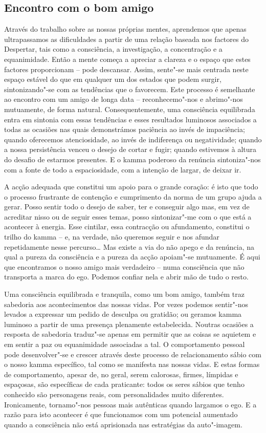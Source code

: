 \subsection{Encontro com o bom amigo}

Através do trabalho sobre as nossas próprias mentes, aprendemos que apenas
ultrapassamos as dificuldades a partir de uma relação baseada nos factores do
Despertar, tais como a consciência, a investigação, a concentração e a
equanimidade. Então a mente começa a apreciar a clareza e o espaço que estes
factores proporcionam -- pode descansar. Assim, sente"-se mais centrada neste
espaço estável do que em qualquer um dos estados que podem surgir,
sintonizando"-se com as tendências que o favorecem. Este processo é semelhante
ao encontro com um amigo de longa data -- reconhecemo"-nos e abrimo"-nos
mutuamente, de forma natural. Consequentemente, uma consciência equilibrada
entra em sintonia com essas tendências e esses resultados luminosos associados a
todas as ocasiões nas quais demonstrámos paciência ao invés de impaciência;
quando oferecemos atenciosidade, ao invés de indiferença ou negatividade; quando
a nossa persistência venceu o desejo de cortar e fugir; quando estivemos à
altura do desafio de estarmos presentes. E o kamma poderoso da renúncia
sintoniza"-nos com a fonte de todo a espaciosidade, com a intenção de largar, de
deixar ir.

A acção adequada que constitui um apoio para o grande coração: é isto que todo o
processo frustrante de contenção e cumprimento da norma de um grupo ajuda a
gerar. Posso sentir todo o desejo de saber, ter e conseguir algo mas, em vez de
acreditar nisso ou de seguir esses temas, posso sintonizar"-me com o que está a
acontecer à energia. Esse cintilar, essa contracção ou afundamento, constitui o
trilho do kamma -- e, na verdade, não queremos seguir e nos afundar
repetidamente nesse percurso\ldots{} Mas existe a via do não apego e da
renúncia, na qual a pureza da consciência e a pureza da acção apoiam"-se
mutuamente. É aqui que encontramos o nosso amigo mais verdadeiro -- numa
consciência que não transporta a marca do ego. Podemos confiar nela e abrir mão
de tudo o resto.

Uma consciência equilibrada e tranquila, como um bom amigo, também traz
sabedoria aos acontecimentos das nossas vidas. Por vezes podemos sentir"-nos
levados a expressar um pedido de desculpa ou gratidão; ou geramos kamma luminoso
a partir de uma presença plenamente estabelecida. Noutras ocasiões a resposta de
sabedoria traduz"-se apenas em permitir que as coisas se aquietem e em sentir a
paz ou equanimidade associadas a tal. O comportamento pessoal pode
\mbox{desenvolver"-se} e crescer através deste processo de relacionamento sábio com o
nosso kamma específico, tal como se manifesta nas nossas vidas. E estas formas
de comportamento, apesar de, no geral, serem calorosas, firmes, límpidas e
espaçosas, são específicas de cada praticante: todos os seres sábios que tenho
conhecido são personagens reais, com personalidades muito diferentes.
Ironicamente, tornamo"-nos pessoas mais autênticas quando largamos o ego. E a
razão para isto acontecer é que funcionamos com um potencial aumentado quando a
consciência não está aprisionada nas estratégias da auto"-imagem.

